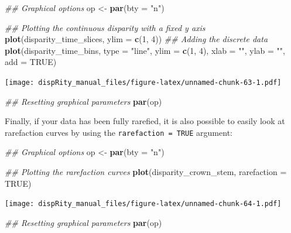 \documentclass[]{book}
\newenvironment{Shaded}{\begin{snugshade}}{\end{snugshade}}
\newcommand{\CommentTok}[1]{\textcolor[rgb]{0.56,0.35,0.01}{\textit{#1}}}
\newcommand{\DataTypeTok}[1]{\textcolor[rgb]{0.13,0.29,0.53}{#1}}
\newcommand{\DecValTok}[1]{\textcolor[rgb]{0.00,0.00,0.81}{#1}}
\newcommand{\KeywordTok}[1]{\textcolor[rgb]{0.13,0.29,0.53}{\textbf{#1}}}
\newcommand{\NormalTok}[1]{#1}
\newcommand{\OtherTok}[1]{\textcolor[rgb]{0.56,0.35,0.01}{#1}}
\newcommand{\StringTok}[1]{\textcolor[rgb]{0.31,0.60,0.02}{#1}}
\begin{document}
\begin{Shaded}
\begin{Highlighting}[]
\CommentTok{## Graphical options}
\NormalTok{op <-}\StringTok{ }\KeywordTok{par}\NormalTok{(}\DataTypeTok{bty =} \StringTok{"n"}\NormalTok{)}

\CommentTok{## Plotting the continuous disparity with a fixed y axis}
\KeywordTok{plot}\NormalTok{(disparity_time_slices, }\DataTypeTok{ylim =} \KeywordTok{c}\NormalTok{(}\DecValTok{1}\NormalTok{, }\DecValTok{4}\NormalTok{))}
\CommentTok{## Adding the discrete data}
\KeywordTok{plot}\NormalTok{(disparity_time_bins, }\DataTypeTok{type =} \StringTok{"line"}\NormalTok{, }\DataTypeTok{ylim =} \KeywordTok{c}\NormalTok{(}\DecValTok{1}\NormalTok{, }\DecValTok{4}\NormalTok{),}
     \DataTypeTok{xlab =} \StringTok{""}\NormalTok{, }\DataTypeTok{ylab =} \StringTok{""}\NormalTok{, }\DataTypeTok{add =} \OtherTok{TRUE}\NormalTok{)}
\end{Highlighting}
\end{Shaded}

\texttt{[image: dispRity\_manual\_files/figure-latex/unnamed-chunk-63-1.pdf]}

\begin{Shaded}
\begin{Highlighting}[]
\CommentTok{## Resetting graphical parameters}
\KeywordTok{par}\NormalTok{(op)}
\end{Highlighting}
\end{Shaded}

Finally, if your data has been fully rarefied, it is also possible to easily look at rarefaction curves by using the \texttt{rarefaction\ =\ TRUE} argument:

\begin{Shaded}
\begin{Highlighting}[]
\CommentTok{## Graphical options}
\NormalTok{op <-}\StringTok{ }\KeywordTok{par}\NormalTok{(}\DataTypeTok{bty =} \StringTok{"n"}\NormalTok{)}

\CommentTok{## Plotting the rarefaction curves}
\KeywordTok{plot}\NormalTok{(disparity_crown_stem, }\DataTypeTok{rarefaction =} \OtherTok{TRUE}\NormalTok{)}
\end{Highlighting}
\end{Shaded}

\texttt{[image: dispRity\_manual\_files/figure-latex/unnamed-chunk-64-1.pdf]}

\begin{Shaded}
\begin{Highlighting}[]
\CommentTok{## Resetting graphical parameters}
\KeywordTok{par}\NormalTok{(op)}
\end{Highlighting}
\end{Shaded}
\end{document}
